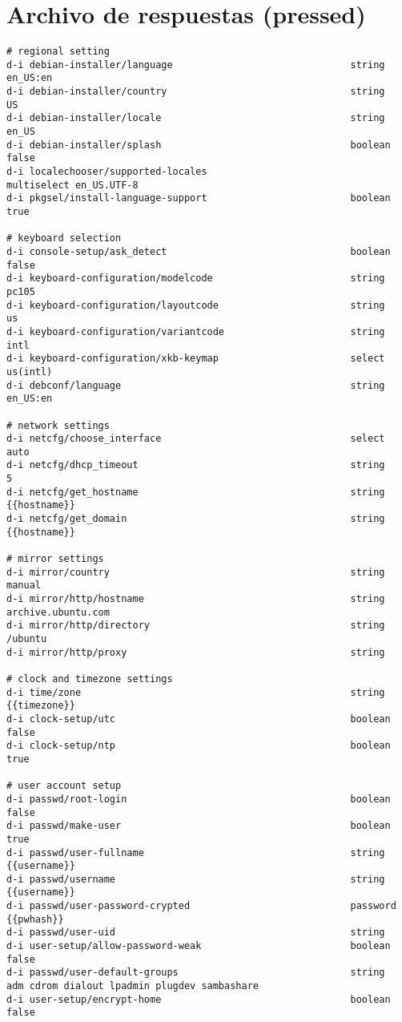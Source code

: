 
\chapter{Archivo de respuestas (pressed)}
\label{pressed}

\begin{lstlisting}[style=json, basicstyle=\ttfamily\tiny]
# regional setting
d-i debian-installer/language                               string      en_US:en
d-i debian-installer/country                                string      US
d-i debian-installer/locale                                 string      en_US
d-i debian-installer/splash                                 boolean     false
d-i localechooser/supported-locales                         multiselect en_US.UTF-8
d-i pkgsel/install-language-support                         boolean     true

# keyboard selection
d-i console-setup/ask_detect                                boolean     false
d-i keyboard-configuration/modelcode                        string      pc105
d-i keyboard-configuration/layoutcode                       string      us
d-i keyboard-configuration/variantcode                      string      intl
d-i keyboard-configuration/xkb-keymap                       select      us(intl)
d-i debconf/language                                        string      en_US:en

# network settings
d-i netcfg/choose_interface                                 select      auto
d-i netcfg/dhcp_timeout                                     string      5
d-i netcfg/get_hostname                                     string      {{hostname}}
d-i netcfg/get_domain                                       string      {{hostname}}

# mirror settings
d-i mirror/country                                          string      manual
d-i mirror/http/hostname                                    string      archive.ubuntu.com
d-i mirror/http/directory                                   string      /ubuntu
d-i mirror/http/proxy                                       string

# clock and timezone settings
d-i time/zone                                               string      {{timezone}}
d-i clock-setup/utc                                         boolean     false
d-i clock-setup/ntp                                         boolean     true

# user account setup
d-i passwd/root-login                                       boolean     false
d-i passwd/make-user                                        boolean     true
d-i passwd/user-fullname                                    string      {{username}}
d-i passwd/username                                         string      {{username}}
d-i passwd/user-password-crypted                            password    {{pwhash}}
d-i passwd/user-uid                                         string
d-i user-setup/allow-password-weak                          boolean     false
d-i passwd/user-default-groups                              string      adm cdrom dialout lpadmin plugdev sambashare
d-i user-setup/encrypt-home                                 boolean     false


\end{lstlisting}
